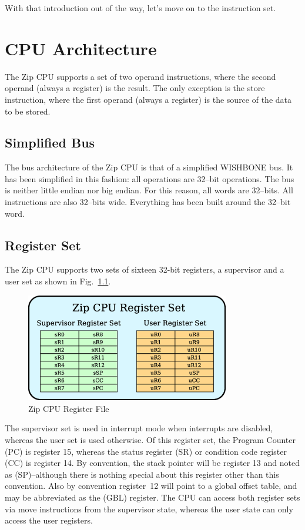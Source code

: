 \documentclass{gqtekspec}
\begin{document}
With that introduction out of the way, let's move on to the instruction
set.

\chapter{CPU Architecture}\label{chap:arch}

The Zip CPU supports a set of two operand instructions, where the second operand
(always a register) is the result.  The only exception is the store instruction,
where the first operand (always a register) is the source of the data to be
stored.

\section{Simplified Bus}
The bus architecture of the Zip CPU is that of a simplified WISHBONE bus.
It has been simplified in this fashion: all operations are 32--bit operations.
The bus is neither little endian nor big endian.  For this reason, all words
are 32--bits.  All instructions are also 32--bits wide.  Everything has been
built around the 32--bit word.

\section{Register Set}
The Zip CPU supports two sets of sixteen 32-bit registers, a supervisor
and a user set as shown in Fig.~\ref{fig:regset}. 
\begin{figure}\begin{center}
\includegraphics[width=3.5in]{../gfx/regset.eps}
\caption{Zip CPU Register File}\label{fig:regset}
\end{center}\end{figure}
The supervisor set is used in interrupt mode when interrupts are disabled,
whereas the user set is used otherwise.  Of this register set, the Program
Counter (PC) is register 15, whereas the status register (SR) or condition
code register
(CC) is register 14.  By convention, the stack pointer will be register 13 and
noted as (SP)--although there is nothing special about this register other
than this convention.  Also by convention register~12 will point to a global
offset table, and may be abbreviated as the (GBL) register.
The CPU can access both register sets via move instructions from the
supervisor state, whereas the user state can only access the user registers.
\end{document}
